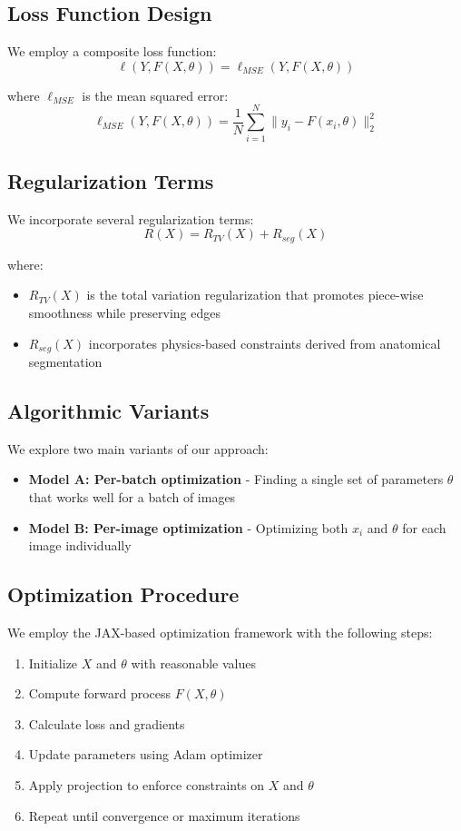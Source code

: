 \documentclass[nomenclature, english, bibtex]{kththesis}
\numberwithin{listing}{chapter}
\begin{document}
\subsection{Loss Function Design}
We employ a composite loss function:
\begin{equation}
\ell(Y, F(X, \theta)) = \ell_{MSE}(Y, F(X, \theta))
\end{equation}

where $\ell_{MSE}$ is the mean squared error:
\begin{equation}
\ell_{MSE}(Y, F(X, \theta)) = \frac{1}{N} \sum_{i=1}^N \|y_i - F(x_i, \theta)\|_2^2
\end{equation}

\subsection{Regularization Terms}
We incorporate several regularization terms:
\begin{equation}
R(X) = R_{TV}(X) + R_{seg}(X)
\end{equation}

where:
\begin{itemize}
    \item $R_{TV}(X)$ is the total variation regularization that promotes piece-wise smoothness while preserving edges
    \item $R_{seg}(X)$ incorporates physics-based constraints derived from anatomical segmentation
\end{itemize}

\subsection{Algorithmic Variants}
We explore two main variants of our approach:
\begin{itemize}
    \item \textbf{Model A: Per-batch optimization} - Finding a single set of parameters $\theta$ that works well for a batch of images
    \item \textbf{Model B: Per-image optimization} - Optimizing both $x_i$ and $\theta$ for each image individually
\end{itemize}

\subsection{Optimization Procedure}
We employ the JAX-based optimization framework with the following steps:
\begin{enumerate}
    \item Initialize $X$ and $\theta$ with reasonable values
    \item Compute forward process $F(X, \theta)$
    \item Calculate loss and gradients
    \item Update parameters using Adam optimizer
    \item Apply projection to enforce constraints on $X$ and $\theta$
    \item Repeat until convergence or maximum iterations
\end{enumerate}
\end{document}
